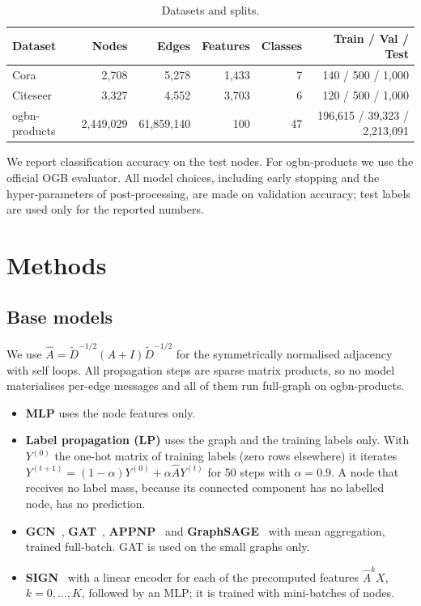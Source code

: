 \documentclass[sigconf,nonacm]{acmart}
\begin{document}
\begin{table}[t]
\caption{Datasets and splits.}
\label{tab:data}
\begin{tabular}{lrrrrr}
\toprule
Dataset & Nodes & Edges & Features & Classes & Train / Val / Test \\
\midrule
Cora & 2{,}708 & 5{,}278 & 1{,}433 & 7 & 140 / 500 / 1{,}000 \\
Citeseer & 3{,}327 & 4{,}552 & 3{,}703 & 6 & 120 / 500 / 1{,}000 \\
ogbn-products & 2{,}449{,}029 & 61{,}859{,}140 & 100 & 47 & 196{,}615 / 39{,}323 / 2{,}213{,}091 \\
\bottomrule
\end{tabular}
\end{table}

We report classification accuracy on the test nodes.
For ogbn-products we use the official OGB evaluator.
All model choices, including early stopping and the hyper-parameters of post-processing, are made on validation accuracy; test labels are used only for the reported numbers.

\section{Methods}
\label{sec:method}

\subsection{Base models}

We use $\hat{A}=\tilde{D}^{-1/2}(A+I)\tilde{D}^{-1/2}$ for the symmetrically normalised adjacency with self loops.
All propagation steps are sparse matrix products, so no model materialises per-edge messages and all of them run full-graph on ogbn-products.

\begin{itemize}
\item \textbf{MLP} uses the node features only.
\item \textbf{Label propagation (LP)} uses the graph and the training labels only. With $Y^{(0)}$ the one-hot matrix of training labels (zero rows elsewhere) it iterates $Y^{(t+1)}=(1-\alpha)Y^{(0)}+\alpha\hat{A}Y^{(t)}$ for 50 steps with $\alpha=0.9$. A node that receives no label mass, because its connected component has no labelled node, has no prediction.
\item \textbf{GCN}~\cite{kipf2017gcn}, \textbf{GAT}~\cite{velickovic2018gat}, \textbf{APPNP}~\cite{gasteiger2019appnp} and \textbf{GraphSAGE}~\cite{hamilton2017sage} with mean aggregation, trained full-batch. GAT is used on the small graphs only.
\item \textbf{SIGN}~\cite{rossi2020sign} with a linear encoder for each of the precomputed features $\hat{A}^k X$, $k=0,\dots,K$, followed by an MLP; it is trained with mini-batches of nodes.
\end{itemize}
\end{document}
